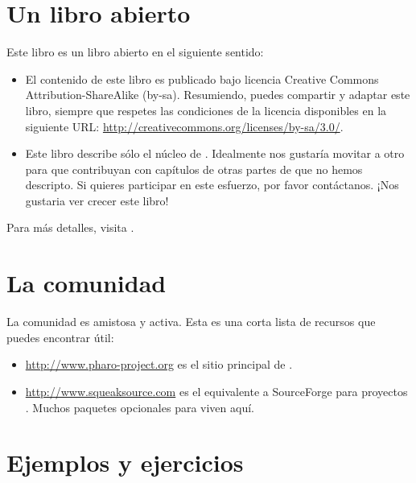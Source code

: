 \documentclass[a4paper,spanish, 10pt,twoside]{book}
\begin{document}
\section*{Un libro abierto}

Este libro es un libro abierto en el siguiente sentido:

\begin{itemize}

\item	El contenido de este libro es publicado bajo licencia Creative Commons Attribution-ShareAlike (by-sa).
		Resumiendo, puedes compartir y adaptar este libro, siempre que respetes las condiciones de la licencia disponibles en la siguiente URL: 
		\url{http://creativecommons.org/licenses/by-sa/3.0/}.

\item	Este libro describe sólo el núcleo de \pharo.
		Idealmente nos gustaría movitar a otro para que contribuyan con capítulos
		de otras partes de \pharo que no hemos descripto.
		Si quieres participar en este esfuerzo, por favor contáctanos. ¡Nos gustaria ver crecer este libro!
\end{itemize}

Para más detalles, visita \pbe.

\section*{La comunidad \pharo}

La comunidad \pharo es amistosa y activa.
Esta es una corta lista de recursos que puedes encontrar útil:

\begin{itemize}
\item \url{http://www.pharo-project.org} es el sitio principal de \pharo.

\item \url{http://www.squeaksource.com} es el equivalente a SourceForge para proyectos \pharo.
Muchos paquetes opcionales para \pharo viven aquí.
\end{itemize}

\section*{Ejemplos y ejercicios}
\end{document}
